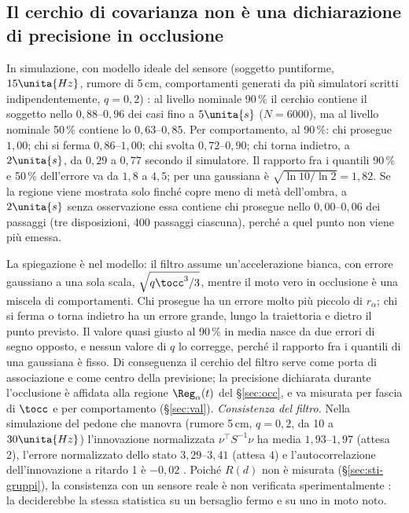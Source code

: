 \subsection{Il cerchio di covarianza non è una dichiarazione di precisione in occlusione}\label{sec:sti-cerchio}

In simulazione, con modello ideale del sensore (soggetto puntiforme, $15\unita{Hz}$, rumore di 5\,cm, comportamenti generati da più simulatori scritti indipendentemente, $q=0{,}2$) : al livello nominale 90\,\% il cerchio contiene il soggetto nello $0{,}88$--$0{,}96$ dei casi fino a $5\unita{s}$ ($N=6000$), ma al livello nominale 50\,\% contiene lo $0{,}63$--$0{,}85$. Per comportamento, al 90\,\%: chi prosegue $1{,}00$; chi si ferma $0{,}86$--$1{,}00$; chi svolta $0{,}72$--$0{,}90$; chi torna indietro, a $2\unita{s}$, da $0{,}29$ a $0{,}77$ secondo il simulatore. Il rapporto fra i quantili 90\,\% e 50\,\% dell'errore va da $1{,}8$ a $4{,}5$; per una gaussiana è $\sqrt{\ln10/\ln2}=1{,}82$. Se la regione viene mostrata solo finché copre meno di metà dell'ombra, a $2\unita{s}$ senza osservazione essa contiene chi prosegue nello $0{,}00$--$0{,}06$ dei passaggi (tre disposizioni, 400 passaggi ciascuna), perché a quel punto non viene più emessa.

La spiegazione è nel modello: il filtro assume un'accelerazione bianca, con errore gaussiano a una sola scala, $\sqrt{q\tocc^3/3}$, mentre il moto vero in occlusione è una miscela di comportamenti. Chi prosegue ha un errore molto più piccolo di $r_\alpha$; chi si ferma o torna indietro ha un errore grande, lungo la traiettoria e dietro il punto previsto. Il valore quasi giusto al 90\,\% in media nasce da due errori di segno opposto, e nessun valore di $q$ lo corregge, perché il rapporto fra i quantili di una gaussiana è fisso. Di conseguenza il cerchio del filtro serve come porta di associazione e come centro della previsione; la precisione dichiarata durante l'occlusione è affidata alla regione $\Reg_\alpha(t)$ del \S\ref{sec:occ}, e va misurata per fascia di $\tocc$ e per comportamento (\S\ref{sec:val}). \emph{Consistenza del filtro.} Nella simulazione del pedone che manovra (rumore 5\,cm, $q=0{,}2$, da 10 a $30\unita{Hz}$) l'innovazione normalizzata $\nu^{\top}S^{-1}\nu$ ha media $1{,}93$--$1{,}97$ (attesa 2), l'errore normalizzato dello stato $3{,}29$--$3{,}41$ (attesa 4) e l'autocorrelazione dell'innovazione a ritardo 1 è $-0{,}02$ . Poiché $R(d)$ non è misurata (\S\ref{sec:sti-gruppi}), la consistenza con un sensore reale è non verificata sperimentalmente : la deciderebbe la stessa statistica su un bersaglio fermo e su uno in moto noto.

